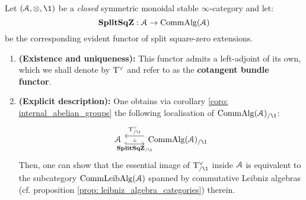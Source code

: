                     \begin{lemma} \label{lemma: cotangent_bundles} 
                        Let $(\calA, \tensor, \1)$ be a \textit{closed} symmetric monoidal stable $\infty$-category and let:
                            $$\mathbf{Split}\mathbf{Sq}\mathbf{Z}: \mathcal{A} \to \mathrm{Comm}\mathrm{Alg}(\mathcal{A})$$
                        be the corresponding evident functor of split square-zero extensions.
                            \begin{enumerate}
                                \item \textbf{(Existence and uniqueness):} This functor admits a left-adjoint of its own, which we shall denote by $\mathrm{T}^{\vee}$ and refer to as the \textbf{cotangent bundle functor}.
                                \item \textbf{(Explicit description):} One obtains via corollary \ref{coro: internal_abelian_groups} the following localisation of $\Comm\Alg(\calA)_{/\1}$:
                                    $$
                                        \begin{tikzcd}
                                        	\calA & {\Comm\Alg(\calA)_{/\1}}
                                        	\arrow[""{name=0, anchor=center, inner sep=0}, "\Split\SqZ_{/\1}"', shift right=2, hook, from=1-1, to=1-2]
                                        	\arrow[""{name=1, anchor=center, inner sep=0}, "{\tangent^{\vee}_{/\1}}"', shift right=2, from=1-2, to=1-1]
                                        	\arrow["\dashv"{anchor=center, rotate=-90}, draw=none, from=1, to=0]
                                        \end{tikzcd}
                                    $$
                                Then, one can show that the essential image of $\tangent^{\vee}_{/\1}$ inside $\mathcal{A}$ is equivalent to the subcategory $\mathrm{Comm}\mathrm{Leib}\mathrm{Alg}(\mathcal{A})$ spanned by commutative Leibniz algebras (cf. proposition \ref{prop: leibniz_algebra_categories}) therein.
                            \end{enumerate}
                    \end{lemma}
